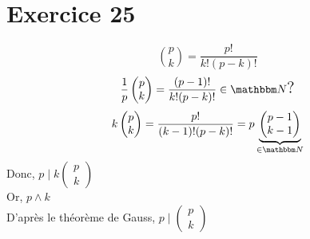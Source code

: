 \part{Exercice 25}

\[
	{p\choose k}  = \frac{p!}{k!(p-k)!}
\] 
\[
\frac{1}{p}\begin{pmatrix} p\\k \end{pmatrix}  = \frac{(p-1)!}{k!(p-k)!} \in \N\text{\Large?}
\] 
\[
k \begin{pmatrix} p\\k \end{pmatrix} = \frac{p!}{(k-1)!(p-k)!} = p \underbrace{\begin{pmatrix} p-1\\k-1 \end{pmatrix}}_{\in \N}
\] 
Donc, $p  \mid  k \begin{pmatrix} p\\k \end{pmatrix}$\\
Or, $p \wedge k$\\
D'après le théorème de Gauss, $p  \mid  \begin{pmatrix}p \\k \end{pmatrix} $
